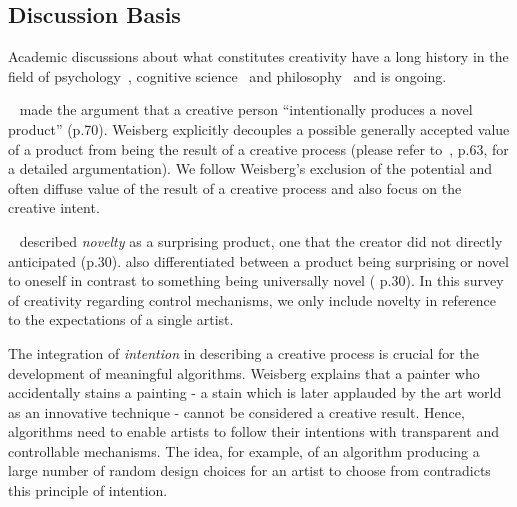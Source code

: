 \subsection{Discussion Basis}
\label{subsec:creative_means}

Academic discussions about what constitutes creativity have a long history in the field of psychology~\cite{weisberg_2006_cui}, cognitive science~\cite{boden_2004_cmm} and philosophy~\cite{gaut_2010_pc} and is ongoing. 


\citeauthor*{weisberg_2006_cui}~\cite{weisberg_2006_cui} made the argument that a creative person ``intentionally produces a novel product'' (p.70). Weisberg explicitly decouples a possible generally accepted value of a product from being the result of a creative process (please refer to~\cite{weisberg_2006_cui}, p.63, for a detailed argumentation). We follow Weisberg's exclusion of the potential and often diffuse value of the result of a creative process and also focus on the creative intent. 

\citeauthor*{boden_2010_cat}~\cite{boden_2010_cat} described \textit{novelty} as a surprising product, one that the creator did not directly anticipated (p.30). \citeauthor*{boden_2010_cat} also differentiated between a product being surprising or novel to oneself in contrast to something being universally novel (\cite{boden_2010_cat} p.30). In this survey of creativity regarding control mechanisms, we only include novelty in reference to the expectations of a single artist.

The integration of \textit{intention} in describing a creative process is crucial for the development of meaningful algorithms. Weisberg explains that a painter who accidentally stains a painting - a stain which is later applauded by the art world as an innovative technique - cannot be considered a creative result. Hence, algorithms need to enable artists to follow their intentions with transparent and controllable mechanisms. The idea, for example, of an algorithm producing a large number of random design choices for an artist to choose from contradicts this principle of intention.


